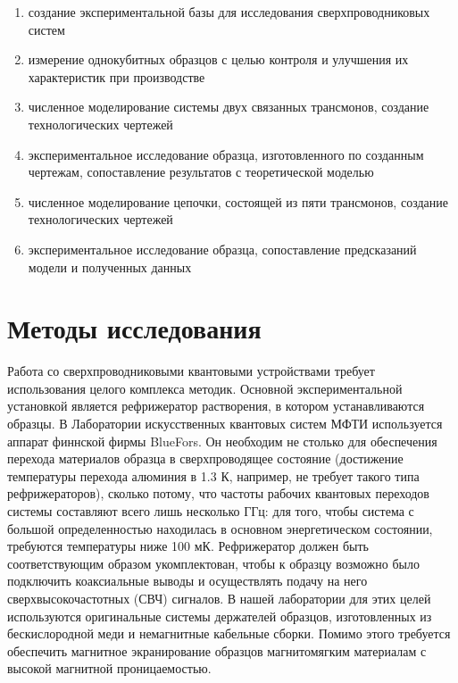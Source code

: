 \documentclass[14pt, a4paper]{extreport}
\numberwithin{equation}{section}
\begin{document}
\begin{enumerate}
	\item создание экспериментальной базы для исследования сверхпроводниковых систем
	\item измерение однокубитных образцов с целью контроля и улучшения их характеристик при производстве
	\item численное моделирование системы двух связанных трансмонов, создание технологических чертежей
	\item экспериментальное исследование образца, изготовленного по созданным чертежам, сопоставление результатов с теоретической моделью
	\item численное моделирование цепочки, состоящей из пяти трансмонов, создание технологических чертежей
	\item экспериментальное исследование образца, сопоставление предсказаний модели и полученных данных
\end{enumerate}


\section*{Методы исследования}

Работа со сверхпроводниковыми квантовыми устройствами требует использования целого комплекса методик. Основной экспериментальной установкой является рефрижератор растворения, в котором устанавливаются образцы. В Лаборатории искусственных квантовых систем МФТИ используется аппарат финнской фирмы BlueFors. Он необходим не столько для обеспечения перехода материалов образца в сверхпроводящее состояние (достижение температуры перехода алюминия в 1.3 К, например, не требует такого типа рефрижераторов), сколько потому, что частоты рабочих квантовых переходов системы составляют всего лишь несколько ГГц: для того, чтобы система с большой определенностью находилась в  основном энергетическом состоянии, требуются температуры ниже 100 мК. Рефрижератор должен быть соответствующим образом укомплектован, чтобы к образцу возможно было подключить коаксиальные выводы и осуществлять подачу на него сверхвысокочастотных (СВЧ) сигналов. В нашей лаборатории для этих целей используются оригинальные системы держателей образцов, изготовленных из бескислородной меди и немагнитные кабельные сборки. Помимо этого требуется обеспечить магнитное экранирование образцов магнитомягким материалам с высокой магнитной проницаемостью.
\end{document}

